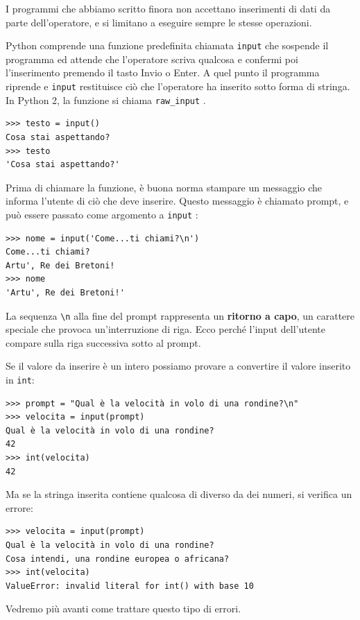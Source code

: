 \documentclass[10pt]{book}
\begin{document}
I programmi che abbiamo scritto finora non accettano inserimenti di dati da parte dell'operatore, e si limitano a eseguire sempre le stesse operazioni.

Python comprende una funzione predefinita chiamata \verb"input" che sospende il programma ed attende che l'operatore scriva qualcosa e confermi poi l'inserimento premendo il tasto {\sf Invio} o {\sf Enter}. A quel punto il programma riprende e \verb"input" restituisce ciò che l'operatore ha inserito sotto forma di stringa. In Python 2, la funzione si chiama \verb"raw_input" .

\begin{verbatim}
>>> testo = input()
Cosa stai aspettando?
>>> testo
'Cosa stai aspettando?'
\end{verbatim}
%
Prima di chiamare la funzione, è buona norma stampare un messaggio che informa l'utente di ciò che deve inserire. Questo messaggio è chiamato prompt, e può essere passato come argomento a \verb"input" :

\begin{verbatim}
>>> nome = input('Come...ti chiami?\n')
Come...ti chiami?
Artu', Re dei Bretoni!
>>> nome
'Artu', Re dei Bretoni!'
\end{verbatim}
%
La sequenza \verb"\n" alla fine del prompt rappresenta un {\bf ritorno a capo},
un carattere speciale che provoca un'interruzione di riga. Ecco perché l'input dell'utente compare sulla riga successiva sotto al prompt.

Se il valore da inserire è un intero possiamo provare a convertire il valore inserito in {\tt int}:


\begin{verbatim}
>>> prompt = "Qual è la velocità in volo di una rondine?\n"
>>> velocita = input(prompt)
Qual è la velocità in volo di una rondine?
42
>>> int(velocita)
42
\end{verbatim}
%
Ma se la stringa inserita contiene qualcosa di diverso da dei numeri, si verifica un errore:

\begin{verbatim}
>>> velocita = input(prompt)
Qual è la velocità in volo di una rondine?
Cosa intendi, una rondine europea o africana?
>>> int(velocita)
ValueError: invalid literal for int() with base 10
\end{verbatim}
%
Vedremo più avanti come trattare questo tipo di errori.
\end{document}
